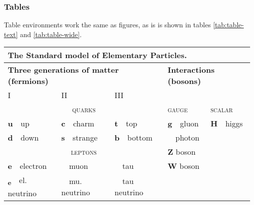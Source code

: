 \documentclass[
	raggedright,
	twoside,
	12pt,
	colorful,
]{tufte-style-article}
\begin{document}
\newpage

\subsubsection{Tables}

Table environments work the same as figures, as is is shown in tables \ref{tab:table-text} and \ref{tab:table-wide}.

\begin{table}[!htb]\small
{}
\begin{tabular}{lllll}
	\multicolumn{5}{l}{\textbf{The Standard model of Elementary Particles.}}\\
	\toprule
	\multicolumn{3}{l}{\textbf{Three generations of matter (fermions)}} & \multicolumn{2}{l}{\textbf{Interactions (bosons)}} \\
	I & II & III & & \\
	\multicolumn{3}{c}{\textsc{quarks}} & \textsc{gauge} & \textsc{scalar} \\
	\cmidrule(lr){1-3}\cmidrule(lr){4-4}\cmidrule(lr){5-5}
	\textbf{u}~~up & \textbf{c}~~charm & \textbf{t}~~top & \textbf{g}~~gluon & \textbf{H}~~higgs \\
	\textbf{d}~~down & \textbf{s}~~strange & \textbf{b}~~bottom & \textbf{\textgamma}~~photon & \\
	\multicolumn{3}{c}{\textsc{leptons}} & \textbf{Z} boson  & \\
	\cmidrule(lr){1-3}
	\textbf{e}~~electron & \textbf{\textmu}~~muon & \textbf{\texttau}~~tau & \textbf{W} boson & \\
	\textbf{\textnu\textsubscript{e}}~~el. neutrino & \textbf{\textnu\textsubscript{\textmu}}~~mu. neutrino & \textbf{\textnu\textsubscript{\texttau}}~~tau neutrino &  & \\
	\bottomrule
\end{tabular}
\end{table}
\end{document}
